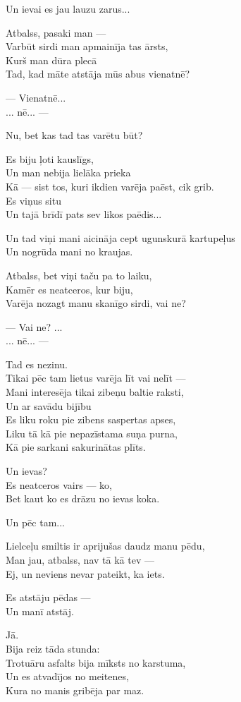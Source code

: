 \documentclass[14pt]{extarticle}
\begin{document}
Un ievai es jau lauzu zarus...

Atbalss, pasaki man ---\\
Varbūt sirdi man apmainīja tas ārsts,\\
Kurš man dūra plecā\\
Tad, kad māte atstāja mūs abus vienatnē?

--- Vienatnē...\\
... nē... ---

Nu, bet kas tad tas varētu būt?

Es biju ļoti kauslīgs,\\
Un man nebija lielāka prieka\\
Kā --- sist tos, kuri ikdien varēja paēst, cik grib.\\
Es viņus situ\\
Un tajā brīdī pats sev likos paēdis...

Un tad viņi mani aicināja cept ugunskurā kartupeļus\\
Un nogrūda mani no kraujas.

Atbalss, bet viņi taču pa to laiku,\\
Kamēr es neatceros, kur biju,\\
Varēja nozagt manu skanīgo sirdi, vai ne?

--- Vai ne? ...\\
... nē... ---

Tad es nezinu.\\
Tikai pēc tam lietus varēja līt vai nelīt ---\\
Mani interesēja tikai zibeņu baltie raksti,\\
Un ar savādu bijību\\
Es liku roku pie zibens saspertas apses,\\
Liku tā kā pie nepazīstama suņa purna,\\
Kā pie sarkani sakurinātas plīts.

Un ievas?\\
Es neatceros vairs --- ko,\\
Bet kaut ko es drāzu no ievas koka.

Un pēc tam...

Lielceļu smiltis ir aprijušas daudz manu pēdu,\\
Man jau, atbalss, nav tā kā tev ---\\
Ej, un neviens nevar pateikt, ka iets.

Es atstāju pēdas ---\\
Un manī atstāj.

Jā.\\
Bija reiz tāda stunda:\\
Trotuāru asfalts bija mīksts no karstuma,\\
Un es atvadījos no meitenes,\\
Kura no manis gribēja par maz.
\end{document}
